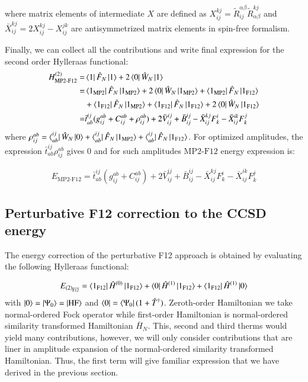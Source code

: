 \documentclass[journal=jacsat]{achemso}
\numberwithin{equation}{section}
\begin{document}
where matrix elements of intermediate $X$ are defined as $X^{kj}_{ij}=\tilde{R}^{\alpha\beta}_{ij}\tilde{R}^{kj}_{\alpha\beta}$ and $\bar{X}^{kj}_{ij}=2X^{kj}_{ij}-X^{jk}_{ij}$ are antisymmetrized matrix elements in spin-free formalism. 

Finally, we can collect all the contributions and write final expression for the second order Hylleraas functional:
\begin{align}
H^{(2)}_{\text{MP2-F12}}=&\bra{1}\hat{F}_{N}\ket{1}+2\bra{0}\hat{W}_{N}\ket{1}\\
=&\bra{1_{\text{MP2}}}\hat{F}_{N}\ket{1_{\text{MP2}}}+2\bra{0}\hat{W}_{N}\ket{1_{\text{MP2}}}+\bra{1_{\text{MP2}}}\hat{F}_{N}\ket{1_{\text{F12}}}\\
&+\bra{1_{\text{F12}}}\hat{F}_{N}\ket{1_{\text{MP2}}}+\bra{1_{\text{F12}}}\hat{F}_{N}\ket{1_{\text{F12}}}+2\bra{0}\hat{W}_{N}\ket{1_{\text{F12}}}\\
=&\bar{t}^{ij}_{ab}(g^{ab}_{ij}+C^{ab}_{ij}+\rho^{ab}_{ij})+2\bar{V}^{ij}_{ij}+\bar{B}^{ij}_{ij}-\bar{X}^{kj}_{ij}F^{i}_{k}-\bar{X}^{ik}_{ij}F^{j}_{k}
\end{align} 
where $\rho^{ab}_{ij}=\bra{^{ij}_{ab}}\hat{W}_{N}\ket{0}+\bra{^{ij}_{ab}}\hat{F}_{N}\ket{1_{\text{MP2}}}+\bra{^{ij}_{ab}}\hat{F}_{N}\ket{1_{\text{F12}}}$. For optimized amplitudes, the expression $\bar{t}^{ij}_{ab}\rho^{ab}_{ij}$ gives 0 and for such amplitudes $\text{MP2-F12}$ energy expression is:

\begin{align}
E_{\text{MP2-F12}}=\bar{t}^{ij}_{ab}(g^{ab}_{ij}+C^{ab}_{ij})+2\bar{V}^{ij}_{ij}+\bar{B}^{ij}_{ij}-\bar{X}^{kj}_{ij}F^{i}_{k}-\bar{X}^{ik}_{ij}F^{j}_{k}
\end{align} 
 
\subsection{Perturbative F12 correction to the CCSD energy} 
The energy correction of the perturbative F12 approach is obtained by evaluating the following Hylleraas functional:

\begin{align}
E_{(2)_{\overline{\text{F12}}}}=\bra{1_{\text{F12}}}\hat{H}^{(0)}\ket{1_{\text{F12}}}+\bra{0}\hat{H}^{(1)}\ket{1_{\text{F12}}}+\bra{1_{\text{F12}}}\hat{H}^{(1)}\ket{0}
\end{align} 
 with $\ket{0}=\ket{\Psi_{0}}=\ket{\text{HF}}$ and $\bra{0}=\bra{\Psi_{0}}(1+\hat{T}^{\dagger})$.
Zeroth-order Hamiltonian we take normal-ordered Fock operator while first-order Hamiltonian is normal-ordered similarity transformed Hamiltonian $\bar{H}_{N}$. This, second and third therms would yield many contributions, however, we will only consider contributions that are liner in amplitude expansion of the normal-ordered similarity transformed Hamiltonian. Thus, the first term will give familiar expression that we have derived in the previous section. 
\end{document}
